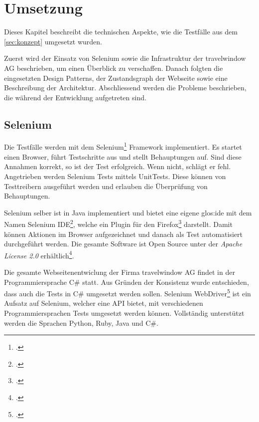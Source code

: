 

\chapter{Umsetzung}
\label{sec:umsetzung}

Dieses Kapitel beschreibt die technischen Aspekte, wie die Testfälle aus dem \cref{sec:konzept}  umgesetzt wurden.

Zuerst wird der Einsatz von Selenium sowie die Infrastruktur der travelwindow AG beschrieben, um einen Überblick zu verschaffen. Danach folgten die eingesetzten Design Patterns, der Zustandsgraph der Webseite sowie eine Beschreibung der Architektur. Abschliessend werden die Probleme beschrieben, die während der Entwicklung aufgetreten sind.

\section{Selenium}
\label{sec:umsetzung:selenium}
Die Testfälle werden mit dem Selenium\footcite{Selenium_-_Web_Browser_Automation_2015-09-26} Framework implementiert. 
Es startet einen Browser, führt Testschritte aus und stellt Behauptungen auf. Sind diese Annahmen korrekt, so ist der Test erfolgreich. Wenn nicht, schlägt er fehl. 
Angetrieben werden Selenium Tests mittels UnitTests. Diese können von Testtreibern ausgeführt werden und erlauben die Überprüfung von Behauptungen.

Selenium selber ist in Java implementiert und bietet eine eigene \Gls{glos:ide} mit dem Namen Selenium IDE\footcite{Selenium_IDE_Plugins_2015-09-26}, welche ein Plugin für den Firefox\footcite{Download_Firefox__Free_Web_Browser__Mozilla_2015-09-26} darstellt. Damit können Aktionen im Browser aufgezeichnet und danach als Test automatisiert durchgeführt werden. Die gesamte Software ist Open Source unter der \textit{Apache License 2.0} erhältlich\footcite{Selenium_software_-_Wikipedia_the_free_encyclopedia_2015-09-26}.

Die gesamte Webseitenentwiclung der Firma travelwindow AG findet in der Programmiersprache C\# statt. Aus Gründen der Konsistenz wurde entschieden, dass auch die Tests in C\# umgesetzt werden sollen. 
Selenium WebDriver\footcite{Selenium_WebDriver_2015-09-26} ist ein Aufsatz auf Selenium, welcher eine API bietet, mit verschiedenen Programmiersprachen Tests umgesetzt werden können. Vollständig unterstützt werden die Sprachen Python, Ruby, Java und C\#. 

